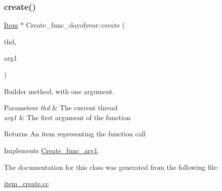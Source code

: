 \subsubsection{\texorpdfstring{create()}{create()}}
{\footnotesize\ttfamily \mbox{\hyperlink{classItem}{Item}} $\ast$ Create\+\_\+func\+\_\+dayofyear\+::create (\begin{DoxyParamCaption}\item[{T\+HD $\ast$}]{thd,  }\item[{\mbox{\hyperlink{classItem}{Item}} $\ast$}]{arg1 }\end{DoxyParamCaption})\hspace{0.3cm}{\ttfamily [virtual]}}

Builder method, with one argument. 
\begin{DoxyParams}{Parameters}
{\em thd} & The current thread \\
\hline
{\em arg1} & The first argument of the function \\
\hline
\end{DoxyParams}
\begin{DoxyReturn}{Returns}
An item representing the function call 
\end{DoxyReturn}


Implements \mbox{\hyperlink{classCreate__func__arg1_a3e9a98f755cd82c3e762e334c955a8c9}{Create\+\_\+func\+\_\+arg1}}.



The documentation for this class was generated from the following file\+:\begin{DoxyCompactItemize}
\item 
\mbox{\hyperlink{item__create_8cc}{item\+\_\+create.\+cc}}\end{DoxyCompactItemize}
